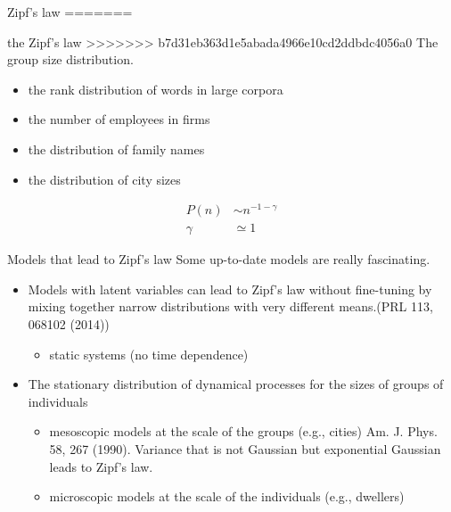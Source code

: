 \documentclass{beamer}
\begin{document}
\begin{frame}{Zipf's law}
=======
\begin{frame}{the Zipf's law}
>>>>>>> b7d31eb363d1e5abada4966e10cd2ddbdc4056a0
  The group size distribution.
  \begin{itemize}
    \item the rank distribution of words in large corpora
    \item the number of employees in firms
    \item the distribution of family names
    \item the distribution of city sizes

  \end{itemize}

  \begin{align}
    P(n)&\sim n^{-1-\gamma}\\
    \gamma&\simeq 1
  \end{align}

\end{frame}

\begin{frame}{Models that lead to Zipf's law}
Some up-to-date models are really fascinating.
  \begin{itemize}
    \item Models with latent variables can lead to Zipf's law without fine-tuning by mixing together narrow distributions with very different means.(PRL 113, 068102 (2014))
    \begin{itemize}
      \item static systems (no time dependence)
    \end{itemize}
    \item The stationary distribution of dynamical processes for the sizes of groups of individuals
    \begin{itemize}
      \item mesoscopic models at the scale of the groups (e.g., cities) Am. J. Phys. 58, 267 (1990). Variance that is not Gaussian but exponential Gaussian leads to Zipf's law.
      \item microscopic models at the scale of the individuals (e.g., dwellers)
    \end{itemize}
  \end{itemize}

\end{frame}


\end{frame}
\end{document}
